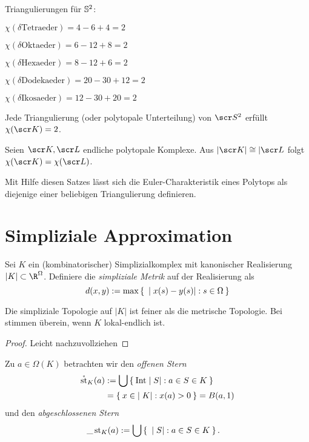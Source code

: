\begin{ex}
	Triangulierungen für $\S^2$:
	\begin{description}
		\item
			$\chi(\delta \text{Tetraeder}) = 4 - 6 + 4 = 2$
		\item
			$\chi(\delta \text{Oktaeder}) = 6 - 12 + 8 = 2$
		\item
			$\chi(\delta \text{Hexaeder}) = 8 - 12 + 6 = 2$
		\item
			$\chi(\delta \text{Dodekaeder}) = 20 - 30 + 12= 2$
		\item
			$\chi(\delta \text{Ikosaeder}) = 12 - 30 + 20= 2$
	\end{description}
\end{ex}

\begin{st}
	Jede Triangulierung (oder polytopale Unterteilung) von $\scr S^2$ erfüllt $\chi(\scr K) = 2$.
\end{st}

\begin{st}
	Seien $\scr K, \scr L$ endliche polytopale Komplexe.
	Aus $|\scr K| \homeomorphic |\scr L$ folgt $\chi(\scr K) = \chi(\scr L)$.
	\begin{note}
		Mit Hilfe diesen Satzes lässt sich die Euler-Charakteristik eines Polytops als diejenige einer beliebigen Triangulierung definieren.
	\end{note}
\end{st}


\section{Simpliziale Approximation}


\begin{df}
	Sei $K$ ein (kombinatorischer) Simplizialkomplex mit kanonischer Realisierung $|K| \subset \R^{\Omega}$.
	Definiere die \emph{simpliziale Metrik} auf der Realisierung als
	\[
		d(x,y) :=
		\max \Set{ |x(s) - y(s)| : s \in \Omega }
	\]
\end{df}

\begin{st}
	Die simpliziale Topologie auf $|K|$ ist feiner als die metrische Topologie.
	Bei stimmen überein, wenn $K$ lokal-endlich ist.
	\begin{proof}
		Leicht nachzuvollziehen
	\end{proof}
\end{st}

\begin{df}
	Zu $a \in \Omega(K)$ betrachten wir den \emph{offenen Stern}
	\begin{align*}
		\mathring \star_K(a)
		&:= \bigcup \Set{ \Int |S| : a \in S \in K } \\
		&= \Set{ x \in |K| : x(a) > 0 }
		= B(a, 1)
	\end{align*}
	und den \emph{abgeschlossenen Stern}
	\begin{align*}
		\_\star_K(a)
		&:= \bigcup \Set{ |S| : a \in S \in K }.
	\end{align*}
\end{df}

